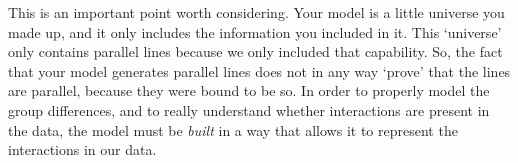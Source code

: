 \documentclass[
]{book}
\newenvironment{Shaded}{\begin{snugshade}}{\end{snugshade}}
\newcommand{\AttributeTok}[1]{\textcolor[rgb]{0.77,0.63,0.00}{#1}}
\newcommand{\ConstantTok}[1]{\textcolor[rgb]{0.00,0.00,0.00}{#1}}
\newcommand{\DecValTok}[1]{\textcolor[rgb]{0.00,0.00,0.81}{#1}}
\newcommand{\FloatTok}[1]{\textcolor[rgb]{0.00,0.00,0.81}{#1}}
\newcommand{\FunctionTok}[1]{\textcolor[rgb]{0.00,0.00,0.00}{#1}}
\newcommand{\NormalTok}[1]{#1}
\newcommand{\SpecialCharTok}[1]{\textcolor[rgb]{0.00,0.00,0.00}{#1}}
\newcommand{\StringTok}[1]{\textcolor[rgb]{0.31,0.60,0.02}{#1}}
\begin{document}
This is an important point worth considering. Your model is a little universe you made up, and it only includes the information you included in it. This `universe' only contains parallel lines because we only included that capability. So, the fact that your model generates parallel lines does not in any way `prove' that the lines are parallel, because they were bound to be so. In order to properly model the group differences, and to really understand whether interactions are present in the data, the model must be \emph{built} in a way that allows it to represent the interactions in our data.

\begin{Shaded}
\end{Shaded}
\end{document}

